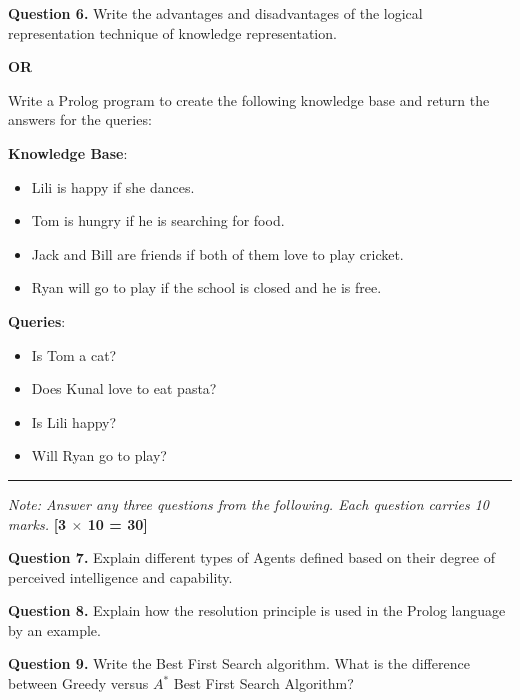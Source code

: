 \documentclass[11pt,a4paper]{article}
\begin{document}
\medskip


\noindent   \textbf{Question 6.} Write the advantages and disadvantages of the logical representation technique of knowledge representation.
\centerline{   \textbf{OR}}
Write a Prolog program to create the following knowledge base and return the answers for the queries:

\begin{parts}
  \item   \textbf{Knowledge Base}:
  
\begin{itemize}
    \item Lili is happy if she dances.
    \item Tom is hungry if he is searching for food.
    \item Jack and Bill are friends if both of them love to play cricket.
    \item Ryan will go to play if the school is closed and he is free.
  \end{itemize}
  \item   \textbf{Queries}:
  
\begin{itemize}
    \item Is Tom a cat?
    \item Does Kunal love to eat pasta?
    \item Is Lili happy?
    \item Will Ryan go to play?
  \end{itemize}
\end{parts}

\bigskip


\rule{\linewidth}{0.4pt}\smallskip




\noindent   \textit{Note: Answer any three questions from the following. Each question carries 10 marks.} \hfill   \textbf{[3 $ \times$ 10 = 30]}

\medskip


\noindent   \textbf{Question 7.} Explain different types of Agents defined based on their degree of perceived intelligence and capability.

\medskip


\noindent   \textbf{Question 8.} Explain how the resolution principle is used in the Prolog language by an example.

\medskip


\noindent   \textbf{Question 9.} Write the Best First Search algorithm. What is the difference between Greedy versus $A^*$ Best First Search Algorithm?
\end{document}
